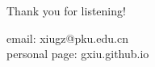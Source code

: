 \begin{frame}
\centering
\Large{Thank you for listening!}

\vspace{2cm}
email: xiugz@pku.edu.cn\\
personal page: gxiu.github.io

    
\end{frame}
